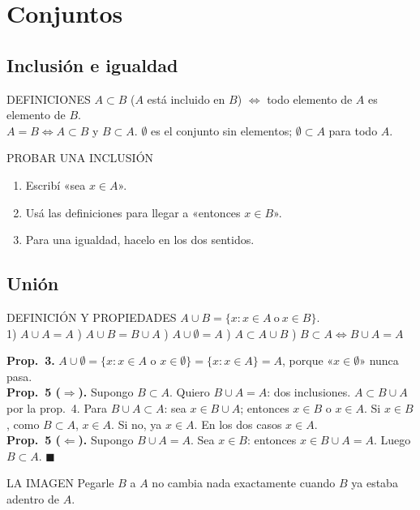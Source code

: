 \chapter{Conjuntos}

\section{Inclusión e igualdad}
\agregado
\begin{sello}{DEFINICIONES}
$A\subset B$ ($A$ está incluido en $B$) $\iff$ todo elemento de $A$ es elemento de $B$.\\[3pt]
$A=B\iff A\subset B$ y $B\subset A$. \quad $\emptyset$ es el conjunto sin elementos; $\emptyset\subset A$ para todo $A$.
\end{sello}
\begin{metodo}{PROBAR UNA INCLUSIÓN}
\begin{enumerate}
\item Escribí «sea $x\in A$».
\item Usá las definiciones para llegar a «entonces $x\in B$».
\item Para una igualdad, hacelo en los dos sentidos.
\end{enumerate}
\end{metodo}

\section{Unión}
\apuntes
\begin{sello}{DEFINICIÓN Y PROPIEDADES}
$A\cup B=\{x: x\in A\ \text{o}\ x\in B\}$.\\[3pt]
1) $A\cup A=A$ ) $A\cup B=B\cup A$ ) $A\cup\emptyset=A$ ) $A\subset A\cup B$ ) $B\subset A\iff B\cup A=A$
\end{sello}
\begin{demo}
\textbf{Prop.\ 3.} $A\cup\emptyset=\{x:x\in A\text{ o }x\in\emptyset\}=\{x:x\in A\}=A$, porque «$x\in\emptyset$» nunca pasa.\\[3pt]
\textbf{Prop.\ 5 ($\Rightarrow$).} Supongo $B\subset A$. Quiero $B\cup A=A$: dos inclusiones.
$A\subset B\cup A$ por la prop.\ 4. Para $B\cup A\subset A$: sea $x\in B\cup A$; entonces $x\in B$ o $x\in A$. Si $x\in B$, como $B\subset A$, $x\in A$. Si no, ya $x\in A$. En los dos casos $x\in A$.\\[3pt]
\textbf{Prop.\ 5 ($\Leftarrow$).} Supongo $B\cup A=A$. Sea $x\in B$: entonces $x\in B\cup A=A$. Luego $B\subset A$. $\blacksquare$
\end{demo}
\begin{tip}{LA IMAGEN}
Pegarle $B$ a $A$ no cambia nada exactamente cuando $B$ ya estaba adentro de $A$.
\end{tip}

